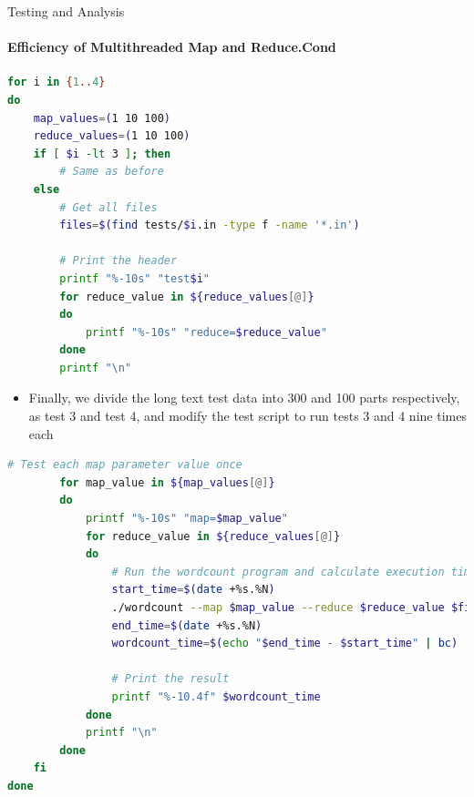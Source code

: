 \documentclass[10pt]{beamer}
\begin{document}
\begin{frame}[fragile]{Testing and Analysis}
    \framesubtitle{Efficiency of Multithreaded Map and Reduce.Cond}
    \begin{minipage}{.41\linewidth}
        \begin{lstlisting}[language=bash, firstnumber=1]
for i in {1..4}
do
    map_values=(1 10 100)
    reduce_values=(1 10 100)
    if [ $i -lt 3 ]; then
        # Same as before
    else
        # Get all files
        files=$(find tests/$i.in -type f -name '*.in')

        # Print the header
        printf "%-10s" "test$i"
        for reduce_value in ${reduce_values[@]}
        do
            printf "%-10s" "reduce=$reduce_value"
        done
        printf "\n"
\end{lstlisting}
        \begin{itemize}
            \item Finally, we divide the long text test data into 300 and 100 parts respectively, as test 3 and test 4, and modify the test script to run tests 3 and 4 nine times each
        \end{itemize}
    \end{minipage}
    \hspace{13pt}
    \begin{minipage}{.55\linewidth}
        \begin{lstlisting}[language=bash, firstnumber=last]
        # Test each map parameter value once
        for map_value in ${map_values[@]}
        do
            printf "%-10s" "map=$map_value"
            for reduce_value in ${reduce_values[@]}
            do
                # Run the wordcount program and calculate execution time
                start_time=$(date +%s.%N)
                ./wordcount --map $map_value --reduce $reduce_value $files | sort > tests-out/$i-$map_value-$reduce_value.out
                end_time=$(date +%s.%N)
                wordcount_time=$(echo "$end_time - $start_time" | bc)

                # Print the result
                printf "%-10.4f" $wordcount_time
            done
            printf "\n"
        done
    fi
done
\end{lstlisting}
    \end{minipage}
\end{frame}
\end{document}
